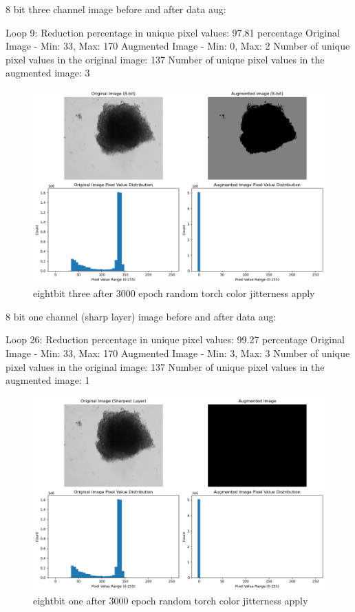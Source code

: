 \documentclass[12pt,twoside,a4paper,parskip]{scrbook} %
\begin{document}
8 bit three channel image before and after data aug:

Loop 9: Reduction percentage in unique pixel values: 97.81 percentage
Original Image - Min: 33, Max: 170
Augmented Image - Min: 0, Max: 2
Number of unique pixel values in the original image: 137
Number of unique pixel values in the augmented image: 3



\begin{figure}[H]
  \centering
  \includegraphics[scale=0.6]{figures/8bit_nThree.png} 
  \caption{eightbit three after 3000 epoch random torch color jitterness apply}
  \label{fig:8bit_nThree}
\end{figure}

8 bit one channel (sharp layer) image before and after data aug:

Loop 26: Reduction percentage in unique pixel values: 99.27 percentage
Original Image - Min: 33, Max: 170
Augmented Image - Min: 3, Max: 3
Number of unique pixel values in the original image: 137
Number of unique pixel values in the augmented image: 1

\begin{figure}[H]
  \centering
  \includegraphics[scale=0.6]{figures/8bit_nOne.png} 
  \caption{eightbit one after 3000 epoch random torch color jitterness apply}
  \label{fig:8bit_n one}
\end{figure}
\end{document}
